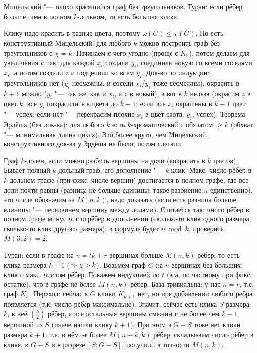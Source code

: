 \section{} %
	Мицельский "--- плохо красящийся граф без треугольников.
	Туран: если рёбер больше, чем в полном $k$-дольном, то есть большая клика.

	Клику надо красить в разные цвета, поэтому $\omega(G) \le \chi(G)$.
	Но есть конструктивный Мицельский: для любого $k$ можно построить граф без треугольников с $\chi=k$.
	Начинаем с чего угодно (проще с $K_2$), потом делаем для увеличения $k$ так: для каждой $x_i$ создали $y_i$, соединили новую со всеми соседями $x_i$,
	а потом создали $z$ и подцепили ко всем $y_i$.
	Док-во по индукции: треугольников нет ($y_i$ несмежны, и соседи $x_i$/$y_i$ тоже несмежны),
	окрасить в $k+1$ можно ($y_i$ "--- так же, как и $x_i$, а $z$ в новый),
	а вот в $k$ нельзя (окрасим $z$ в цвет $k$, все $y_i$ покрасились в цвета до $k-1$;
	если все $x_i$ окрашены в $k-1$ цвет "--- успех; если нет "--- перекрасим плохие $x_i$ в цвет соотв. $y_i$, успех).
	Теорема Эрдёша (без док-ва): для любого $k$ есть $k$-хроматический с обхватом $\ge k$ (обхват "--- минимальная длина цикла).
	Это более круто, чем Мицельский, конструктивного док-ва у Эрдёша не было, потом сделали.

	Граф $k$-долен, если можно разбить вершины на доли (покрасить в $k$ цветов).
	Бывает полный $k$-дольный граф, его дополнение "--- $k$ клик.
	Макс. число рёбер в $k$-дольном графе (при фикс. числе вершин) достигается в полном графе, где все доли почти равны (разница не больше единицы,
	такое разбиение $n$ единственно), это числе обозначим за $M(n, k)$, надо доказать (если есть разница больше единицы "--- передвинем вершину между долями).
	Считается так: число рёбер в полном графе минус число рёбер в дополнении (сколько-то клик одного размера, сколько-то клик другого размера),
	в формуле будет $n \bmod k$, проверить $M(3, 2)=2$.

	Туран: если в графе на $n=tk+r$ вершинах больше $M(n, k)$ рёбер, то есть клика размера $k+1$ ($\Rightarrow \chi>k$).
	Возьмём граф $G$ на $n$ вершинах без больших клик с макс. числом рёбер.
	Покажем индукцией по $t$ (ага, по частному при фикс. остатке), что в графе не более $M(n,k)$ рёбер.
	База тривиальна: у нас $n=r$, т.е. граф $K_n$.
	Переход: сейчас в $G$ клики $K_{k+1}$ нет, но при добавлении любого ребра появляется (т.к. число рёбер максимально).
	Значит, сейчас есть клика $S$ размера $k$, в неё $\binom{k}{2}$ рёбер, а все остальные вершины смежны с не более чем $k-1$ вершиной из $S$ (иначе нашли клику $k+1$).
	При этом в $G-S$ тоже нет клики размера $k+1$, т.е. в нём не более $M(n-k,k)$ рёбер, складываем число рёбер в клике, в $G-S$ и в разрезе $[S;G-S]$, получили в точности $M(n,k)$.
